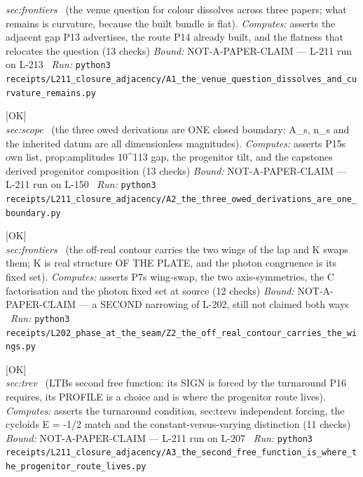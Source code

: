 \begin{description}
\textit{sec:frontiers} \ (the venue question for colour dissolves across three papers; what remains is curvature, because the built bundle is flat). 
\emph{Computes:} asserts the adjacent gap P13 advertises, the route P14 already built, and the flatness that relocates the question (13 checks)
 \emph{Bound:} NOT-A-PAPER-CLAIM --- L-211 run on L-213
\ \emph{Run:} \texttt{python3 receipts/L211\_closure\_adjacency/A1\_the\_venue\_question\_dissolves\_and\_curvature\_remains.py}
\item[\label{rcpt:A2_the_three_owed_derivations_are_one_boundary}\texttt{A2\_the\_three\_owed\_derivations\_are\_one\_boundary}]\hfill\textsf{[OK]}\\
\textit{sec:scope} \ (the three owed derivations are ONE closed boundary: A\_s, n\_s and the inherited datum are all dimensionless magnitudes). 
\emph{Computes:} asserts P15s own list, prop:amplitudes 10\textasciicircum{}113 gap, the progenitor tilt, and the capstones derived progenitor composition (13 checks)
 \emph{Bound:} NOT-A-PAPER-CLAIM --- L-211 run on L-150
\ \emph{Run:} \texttt{python3 receipts/L211\_closure\_adjacency/A2\_the\_three\_owed\_derivations\_are\_one\_boundary.py}
\item[\label{rcpt:Z2_the_off_real_contour_carries_the_wings}\texttt{Z2\_the\_off\_real\_contour\_carries\_the\_wings}]\hfill\textsf{[OK]}\\
\textit{sec:frontiers} \ (the off-real contour carries the two wings of the lap and K swaps them; K is real structure OF THE PLATE, and the photon congruence is its fixed set). 
\emph{Computes:} asserts P7s wing-swap, the two axis-symmetries, the C factorisation and the photon fixed set at source (12 checks)
 \emph{Bound:} NOT-A-PAPER-CLAIM --- a SECOND narrowing of L-202, still not claimed both ways
\ \emph{Run:} \texttt{python3 receipts/L202\_phase\_at\_the\_seam/Z2\_the\_off\_real\_contour\_carries\_the\_wings.py}
\item[\label{rcpt:A3_the_second_free_function_is_where_the_progenitor_route_lives}\texttt{A3\_the\_second\_free\_function\_is\_where\_the\_progenitor\_route\_lives}]\hfill\textsf{[OK]}\\
\textit{sec:trev} \ (LTBs second free function: its SIGN is forced by the turnaround P16 requires, its PROFILE is a choice and is where the progenitor route lives). 
\emph{Computes:} asserts the turnaround condition, sec:trevs independent forcing, the cycloids E = -1/2 match and the constant-versus-varying distinction (11 checks)
 \emph{Bound:} NOT-A-PAPER-CLAIM --- L-211 run on L-207
\ \emph{Run:} \texttt{python3 receipts/L211\_closure\_adjacency/A3\_the\_second\_free\_function\_is\_where\_the\_progenitor\_route\_lives.py}

\end{description}
